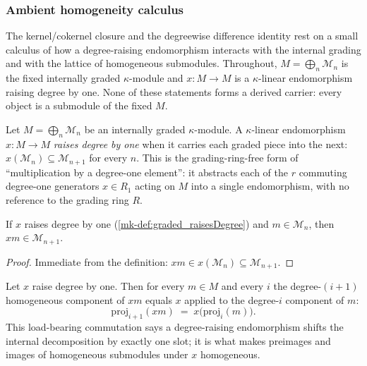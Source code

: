 \subsubsection*{Ambient homogeneity calculus}

The kernel/cokernel closure and the degreewise difference identity rest on a small
calculus of how a degree-raising endomorphism interacts with the internal grading and
with the lattice of homogeneous submodules. Throughout, \(M = \bigoplus_n \mathcal{M}_n\)
is the fixed internally graded \(\kappa\)-module and \(x : M \to M\) is a
\(\kappa\)-linear endomorphism raising degree by one. None of these statements forms a
derived carrier: every object is a submodule of the fixed \(M\).

\begin{definition}\label{mk-def:graded_raisesDegree}
  \leanok

  Let \(M = \bigoplus_n \mathcal{M}_n\) be an internally graded \(\kappa\)-module. A
  \(\kappa\)-linear endomorphism \(x : M \to M\) \emph{raises degree by one} when it
  carries each graded piece into the next: \(x(\mathcal{M}_n) \subseteq
  \mathcal{M}_{n+1}\) for every \(n\). This is the grading-ring-free form of
  ``multiplication by a degree-one element'': it abstracts each of the \(r\)
  commuting degree-one generators \(x \in R_1\) acting on \(M\) into a single
  endomorphism, with no reference to the grading ring \(R\).
\end{definition}

\begin{lemma}\label{mk-lem:graded_raisesDegree_mem}
  \leanok

  If \(x\) raises degree by one (\ref{mk-def:graded_raisesDegree}) and \(m \in
  \mathcal{M}_n\), then \(x m \in \mathcal{M}_{n+1}\).
\end{lemma}

\begin{proof}
  \leanok
  Immediate from the definition: \(x m \in x(\mathcal{M}_n) \subseteq
  \mathcal{M}_{n+1}\).
\end{proof}

\begin{lemma}\label{mk-lem:graded_decompose_raisesDegree}
  \leanok

  Let \(x\) raise degree by one. Then for every \(m \in M\) and every \(i\) the
  degree-\((i+1)\) homogeneous component of \(x m\) equals \(x\) applied to the
  degree-\(i\) component of \(m\):
  \[
    \mathrm{proj}_{i+1}(x m) \;=\; x\bigl(\mathrm{proj}_i(m)\bigr) .
  \]
  This load-bearing commutation says a degree-raising endomorphism shifts the
  internal decomposition by exactly one slot; it is what makes preimages and images
  of homogeneous submodules under \(x\) homogeneous.
\end{lemma}

